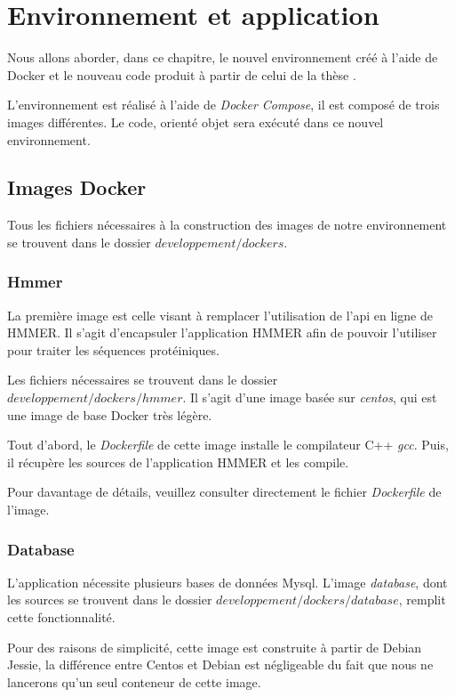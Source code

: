 \chapter{Environnement et application}
\label{ch:app}

Nous allons aborder, dans ce chapitre, le nouvel environnement créé à l'aide de Docker et le nouveau code produit à partir de celui de la thèse \thLeite.

L'environnement est réalisé à l'aide de \emph{Docker Compose}, il est composé de trois images différentes. Le code, orienté objet sera exécuté dans ce nouvel environnement.

\section{Images Docker}
Tous les fichiers nécessaires à la construction des images de notre environnement se trouvent dans le dossier \emph{$developpement/dockers$}.

\subsection{Hmmer}
La première image est celle visant à remplacer l'utilisation de l'\gls{api} en ligne de HMMER. Il s’agit d'encapsuler l'application HMMER afin de pouvoir l'utiliser pour traiter les séquences protéiniques.

Les fichiers nécessaires se trouvent dans le dossier \emph{$developpement/dockers/hmmer$}. Il s’agit d'une image basée sur \emph{centos}, qui est une image de base Docker très légère.

Tout d'abord, le \emph{Dockerfile} de cette image installe le compilateur C++ \emph{gcc}. Puis, il récupère les sources de l'application HMMER et les compile.

Pour davantage de détails, veuillez consulter directement le fichier \emph{Dockerfile} de l'image.

\subsection{Database}
L'application nécessite plusieurs bases de données Mysql. L'image \emph{database}, dont les sources se trouvent dans le dossier \emph{$developpement/dockers/database$}, remplit cette fonctionnalité.

Pour des raisons de simplicité, cette image est construite à partir de Debian Jessie, la différence entre Centos et Debian est négligeable du fait que nous ne lancerons qu'un seul conteneur de cette image.

